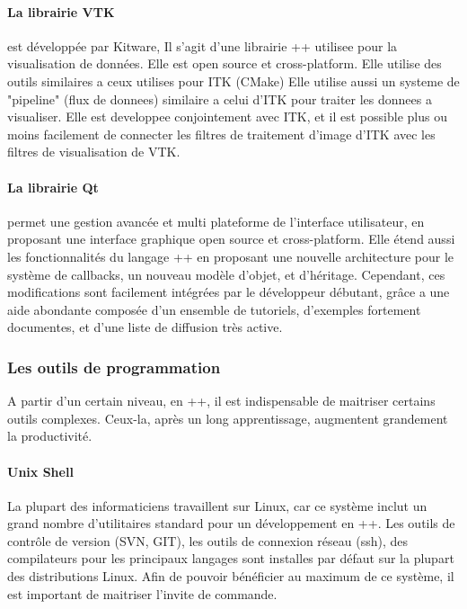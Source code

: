 \paragraph{La librairie VTK} est développée par Kitware, Il s'agit d'une librairie \C++ utilisee pour la visualisation de données. Elle est open source et cross-platform. Elle utilise des outils similaires a ceux utilises pour ITK (CMake)
Elle utilise aussi un systeme de "pipeline" (flux de donnees) similaire a celui d'ITK pour traiter les donnees a visualiser. Elle est developpee conjointement avec ITK, et il est possible plus ou moins facilement de connecter les filtres de traitement d'image d'ITK avec les filtres de visualisation de VTK.

\paragraph{La librairie Qt} permet une gestion avancée et multi plateforme de l'interface utilisateur, en proposant une interface graphique open source et cross-platform.
Elle étend aussi les fonctionnalités du langage \C++ en proposant une nouvelle architecture pour le système de callbacks, un nouveau modèle d'objet, et d'héritage. Cependant, ces modifications sont facilement intégrées par le développeur débutant, grâce a une aide abondante composée d'un ensemble de tutoriels, d'exemples fortement documentes, et d'une liste de diffusion très active.



\subsubsection{Les outils de programmation}

A partir d'un certain niveau, en {\C++}, il est indispensable de maitriser certains outils complexes. Ceux-la, après un long apprentissage, augmentent grandement la productivité.

\paragraph{Unix Shell}
La plupart des informaticiens travaillent sur Linux, car ce système inclut un grand nombre d'utilitaires standard pour un développement en {\C++}. Les outils de contrôle de version (SVN, GIT), les outils de connexion réseau (ssh), des compilateurs pour les principaux langages sont installes par défaut sur la plupart des distributions Linux.
Afin de pouvoir bénéficier au maximum de ce système, il est important de maitriser l'invite de commande.

